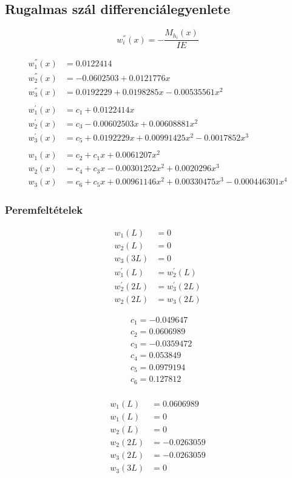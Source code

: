 \subsection{Rugalmas szál differenciálegyenlete}
\begin{equation*}
	w_i^{''}(x) = -\frac{M_{h_i}(x)}{IE}
\end{equation*}

\begin{align*}
	w_1^{''}(x) &= 0.0122414 \\
	w_2^{''}(x) &= -0.0602503 + 0.0121776x \\
	w_3^{''}(x) &= 0.0192229 + 0.0198285x - 0.00535561x^2 \\ \\
	w_1^{'}(x) &= c_1 + 0.0122414x \\
	w_2^{'}(x) &= c_3  -0.00602503x + 0.00608881x^2 \\
	w_3^{'}(x) &= c_5 + 0.0192229x+0.00991425x^2-0.0017852x^3 \\ \\
	w_1(x) &= c_2 + c_1 x + 0.0061207x^2 \\
	w_2(x) &= c_4 + c_3 x - 0.00301252x^2 + 0.0020296x^3 \\
	w_3(x) &= c_6 + c_5 x + 0.00961146x^2 + 0.00330475x^3 - 0.000446301x^4
\end{align*}

\subsubsection{Peremfeltételek}
\begin{align*}
	w_1(L) &= 0 \\
	w_2(L) &= 0 \\
	w_3(3L) &= 0 \\
	w_1^{'}(L) &= w_2^{'}(L) \\
	w_2^{'}(2L) &= w_3^{'}(2L) \\
	w_2(2L) &= w_3(2L) 
\end{align*}

\begin{align*}
	&c_1 = -0.049647 \\
	&c_2 = 0.0606989 \\
	&c_3 = -0.0359472 \\
	&c_4 = 0.053849 \\
	&c_5 = 0.0979194 \\
	&c_6 = 0.127812 \\
\end{align*}

\begin{align*}
	w_1(L) &= 0.0606989 \\
	w_1(L) &= 0 \\
	w_2(L) &= 0 \\
	w_2(2L) &= -0.0263059 \\
	w_3(2L) &= -0.0263059 \\
	w_3(3L) &= 0 \\
\end{align*}

